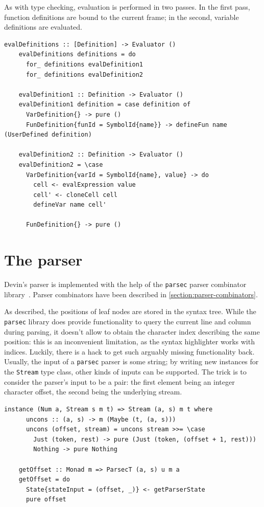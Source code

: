 \documentclass[UdineBachThesis,american,11pt]{PhdThesis}
\begin{document}
  As with type checking, evaluation is performed in two passes. In the first
  pass, function definitions are bound to the current frame; in the second,
  variable definitions are evaluated.

  \begin{Verbatim}[gobble=4,fontsize=\small]
    evalDefinitions :: [Definition] -> Evaluator ()
    evalDefinitions definitions = do
      for_ definitions evalDefinition1
      for_ definitions evalDefinition2

    evalDefinition1 :: Definition -> Evaluator ()
    evalDefinition1 definition = case definition of
      VarDefinition{} -> pure ()
      FunDefinition{funId = SymbolId{name}} -> defineFun name (UserDefined definition)

    evalDefinition2 :: Definition -> Evaluator ()
    evalDefinition2 = \case
      VarDefinition{varId = SymbolId{name}, value} -> do
        cell <- evalExpression value
        cell' <- cloneCell cell
        defineVar name cell'

      FunDefinition{} -> pure ()
  \end{Verbatim}

  \section{The parser}

  Devin's parser is implemented with the help of the \mbox{\texttt{parsec}}
  parser combinator library~\cite{parsec}. Parser combinators have been
  described in \autoref{section:parser-combinators}.

  As described, the positions of leaf nodes are stored in the syntax tree. While
  the \mbox{\texttt{parsec}} library does provide functionality to query the
  current line and column during parsing, it doesn't allow to obtain the
  character index describing the same position: this is an inconvenient
  limitation, as the syntax highlighter works with indices. Luckily, there is a
  hack to get such arguably missing functionality back. Usually, the input of a
  \mbox{\texttt{parsec}} parser is some string; by writing new instances for the
  \mbox{\texttt{Stream}} type class, other kinds of inputs can be supported. The
  trick is to consider the parser's input to be a pair: the first element being
  an integer character offset, the second being the underlying stream.

  \begin{Verbatim}[gobble=4,fontsize=\small]
    instance (Num a, Stream s m t) => Stream (a, s) m t where
      uncons :: (a, s) -> m (Maybe (t, (a, s)))
      uncons (offset, stream) = uncons stream >>= \case
        Just (token, rest) -> pure (Just (token, (offset + 1, rest)))
        Nothing -> pure Nothing

    getOffset :: Monad m => ParsecT (a, s) u m a
    getOffset = do
      State{stateInput = (offset, _)} <- getParserState
      pure offset
  \end{Verbatim}
\end{document}
